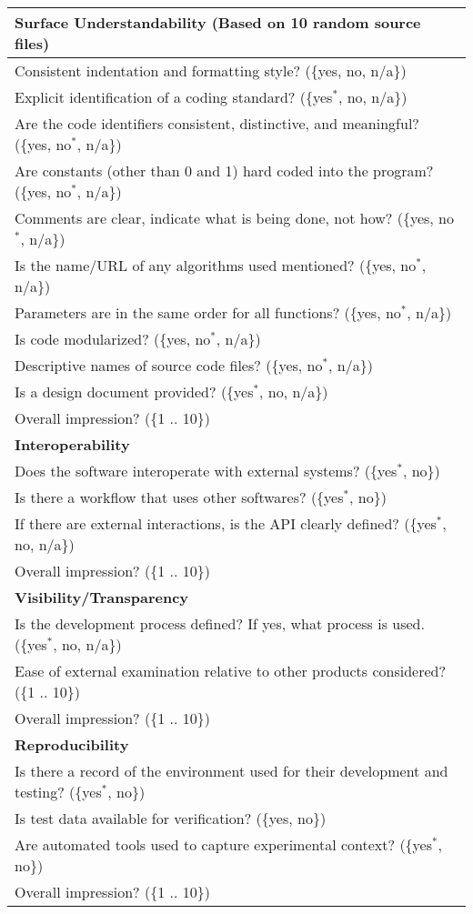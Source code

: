 \begin{longtable}{p{16cm}}
  \midrule
  \textbf{Surface Understandability} (Based on 10 random source files)\\
  \midrule

  Consistent indentation and formatting style? (\{yes, no, n/a\})\\
  Explicit identification of a coding standard? (\{yes$^*$, no, n/a\})\\
  Are the code identifiers consistent, distinctive, and
  meaningful? (\{yes, no$^*$, n/a\})\\
  Are constants (other than 0 and 1) hard coded into the program? (\{yes, no$^*$, n/a\})\\
  Comments are clear, indicate what is being done, not how? (\{yes, no$^*$, n/a\})\\
  Is the name/URL of any algorithms used mentioned?
  (\{yes, no$^*$, n/a\})\\
  Parameters are in the same order for all functions? (\{yes, no$^*$, n/a\})\\
  Is code modularized? (\{yes, no$^*$, n/a\})\\
  Descriptive names of source code files? (\{yes, no$^*$, n/a\})\\
  Is a design document provided? (\{yes$^*$, no, n/a\})\\
  Overall impression? (\{1 .. 10\})\\

  \midrule
  \textbf{Interoperability}\\
  \midrule

  Does the software interoperate with external systems? (\{yes$^*$, no\})\\
  Is there a workflow that uses other softwares? (\{yes$^*$, no\})\\
  If there are external interactions, is the API clearly defined? (\{yes$^*$, no, n/a\})\\
  Overall impression? (\{1 .. 10\})\\

  \midrule
  \textbf{Visibility/Transparency}\\
  \midrule

  Is the development process defined? If yes, what process is used. (\{yes$^*$, no, n/a\})\\
  Ease of external examination relative to other products
  considered?  (\{1 .. 10\})\\
  Overall impression? (\{1 .. 10\})\\

  \midrule
  \textbf{Reproducibility}\\
  \midrule

  Is there a record of the environment used for their development and testing?
  (\{yes$^*$, no\})\\
  Is test data available for verification?  (\{yes, no\})\\
  Are automated tools used to capture experimental context?  (\{yes$^*$, no\})\\
  Overall impression? (\{1 .. 10\})\\

  \bottomrule

\end{longtable}
